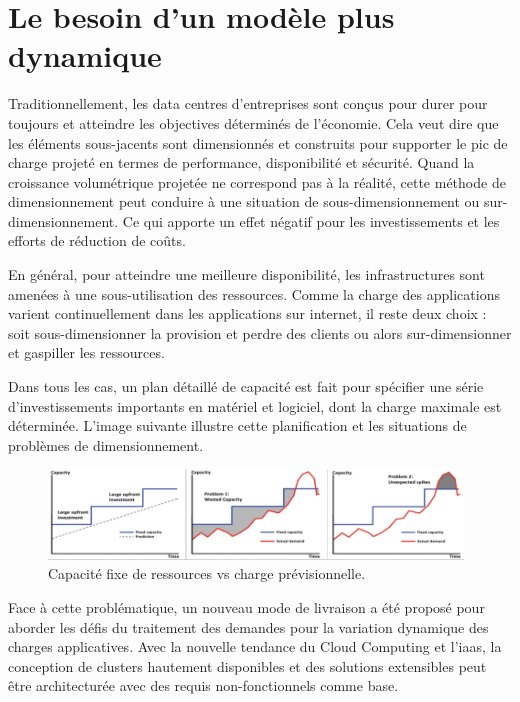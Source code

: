 \section{Le besoin d'un modèle plus dynamique}


Traditionnellement, les data centres d'entreprises sont conçus pour durer pour toujours et atteindre les objectives déterminés de l'économie. Cela veut dire que les éléments sous-jacents sont dimensionnés et construits pour supporter le pic de charge projeté en termes de performance, disponibilité et sécurité. Quand la croissance volumétrique projetée ne correspond pas à la réalité, cette méthode de dimensionnement peut conduire à une situation de sous-dimensionnement ou sur-dimensionnement. Ce qui apporte un effet négatif pour les investissements et les efforts de réduction de coûts.

En général, pour atteindre une meilleure disponibilité, les infrastructures sont amenées à une sous-utilisation des ressources. Comme la charge des applications varient continuellement dans les applications sur internet, il reste deux choix : soit sous-dimensionner la provision et perdre des clients ou alors sur-dimensionner et gaspiller les ressources. 

Dans tous les cas, un plan détaillé de capacité est fait pour spécifier une série d'investissements importants en matériel et logiciel, dont la charge maximale est déterminée. L'image suivante illustre cette planification et les situations de problèmes de dimensionnement.\\


\begin{figure}[h]
\begin{center}
\includegraphics[width=0.98\textwidth]{images/fixed_capacity_load_prediction} 
\caption{Capacité fixe de ressources vs charge prévisionnelle. \cite{awsScaling}}
\end{center}
\end{figure}

Face à cette problématique, un nouveau mode de livraison a été proposé pour aborder les défis du traitement des demandes pour la variation dynamique des charges applicatives. Avec la nouvelle tendance du Cloud Computing et l'\gls{iaas}, la conception de \glspl{cluster} hautement disponibles et des solutions extensibles peut être architecturée avec des requis non-fonctionnels comme base. 

